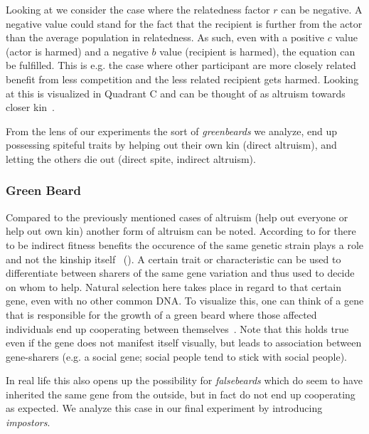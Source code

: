 \documentclass[sigconf]{acmart}
\newcommand{\impostors}{\textit{impostors}\xspace}
\newcommand{\greenbeards}{\textit{greenbeards}\xspace}
\begin{document}
    Looking at  we consider the case where the relatedness factor $r$ can be negative.
    A negative value could stand for the fact that the recipient is further from the actor than the average population in relatedness.
    As such, even with a positive $c$ value (actor is harmed) and a negative $b$ value (recipient is harmed), the equation can be fulfilled.
    This is e.g. the case where other participant are more closely related benefit from less competition and the less related recipient gets harmed.
    Looking at  this is visualized in Quadrant C and can be thought of as altruism towards closer kin~\cite{west_altruism_2010}.

    From the lens of our experiments the sort of \greenbeards we analyze, end up possessing spiteful traits by helping out their own kin (direct altruism), and letting the others die out (direct spite, indirect altruism).

    \subsubsection{Green Beard}
    Compared to the previously mentioned cases of altruism (help out everyone or help out own kin) another form of altruism can be noted.
    According to \citeauthor{hamiltonInnateSocialAptitudes1975} for there to be indirect fitness benefits the occurence of the same genetic strain plays a role and not the kinship itself~\cite{hamiltonInnateSocialAptitudes1975} ().
    A certain trait or characteristic can be used to differentiate between sharers of the same gene variation and thus used to decide on whom to help.
    Natural selection here takes place in regard to that certain gene, even with no other common DNA.
    To visualize this, one can think of a gene that is responsible for the growth of a green beard where those affected individuals end up cooperating between themselves~\cite{SelfishGeneRichard}.
    Note that this holds true even if the gene does not manifest itself visually, but leads to association between gene-sharers (e.g. a social gene; social people tend to stick with social people).

    In real life this also opens up the possibility for \textit{falsebeards} which do seem to have inherited the same gene from the outside, but in fact do not end up cooperating as expected.
    We analyze this case in our final experiment by introducing \impostors.
\end{document}
